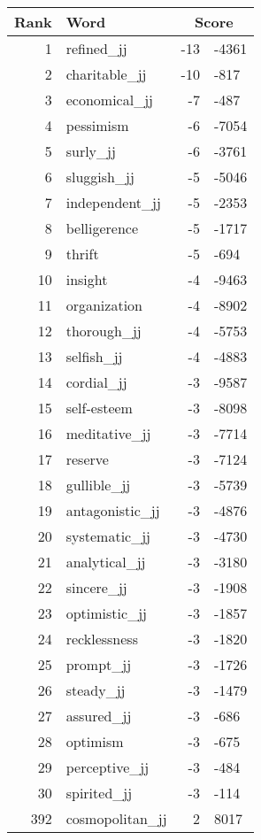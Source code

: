\begin{longtable}[!htbp]{| rlr@{.}l |}
    \hline
    \textbf{Rank} & \textbf{Word} & \multicolumn{2}{c|}{\textbf{Score}} \\
    \hline
    \endhead
    1 & refined\_jj & -13 & -4361 \\
    2 & charitable\_jj & -10 & -817 \\
    3 & economical\_jj & -7 & -487 \\
    4 & pessimism & -6 & -7054 \\
    5 & surly\_jj & -6 & -3761 \\
    6 & sluggish\_jj & -5 & -5046 \\
    7 & independent\_jj & -5 & -2353 \\
    8 & belligerence & -5 & -1717 \\
    9 & thrift & -5 & -694 \\
    10 & insight & -4 & -9463 \\
    11 & organization & -4 & -8902 \\
    12 & thorough\_jj & -4 & -5753 \\
    13 & selfish\_jj & -4 & -4883 \\
    14 & cordial\_jj & -3 & -9587 \\
    15 & self-esteem & -3 & -8098 \\
    16 & meditative\_jj & -3 & -7714 \\
    17 & reserve & -3 & -7124 \\
    18 & gullible\_jj & -3 & -5739 \\
    19 & antagonistic\_jj & -3 & -4876 \\
    20 & systematic\_jj & -3 & -4730 \\
    21 & analytical\_jj & -3 & -3180 \\
    22 & sincere\_jj & -3 & -1908 \\
    23 & optimistic\_jj & -3 & -1857 \\
    24 & recklessness & -3 & -1820 \\
    25 & prompt\_jj & -3 & -1726 \\
    26 & steady\_jj & -3 & -1479 \\
    27 & assured\_jj & -3 & -686 \\
    28 & optimism & -3 & -675 \\
    29 & perceptive\_jj & -3 & -484 \\
    30 & spirited\_jj & -3 & -114 \\
    392 & cosmopolitan\_jj & 2 & 8017 \\

\end{longtable}
